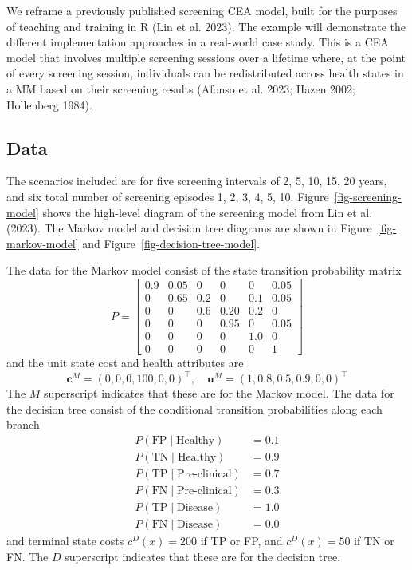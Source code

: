 \documentclass[
]{article}
\begin{document}
We reframe a previously published screening CEA model, built for the
purposes of teaching and training in R (Lin et al. 2023). The example
will demonstrate the different implementation approaches in a real-world
case study. This is a CEA model that involves multiple screening
sessions over a lifetime where, at the point of every screening session,
individuals can be redistributed across health states in a MM based on
their screening results (Afonso et al. 2023; Hazen 2002; Hollenberg
1984).

\subsection{Data}\label{data}

The scenarios included are for five screening intervals of 2, 5, 10, 15,
20 years, and six total number of screening episodes 1, 2, 3, 4, 5, 10.
Figure~\ref{fig-screening-model} shows the high-level diagram of the
screening model from Lin et al. (2023). The Markov model and decision
tree diagrams are shown in Figure~\ref{fig-markov-model} and
Figure~\ref{fig-decision-tree-model}.

The data for the Markov model consist of the state transition
probability matrix \[
P = \begin{bmatrix}
0.9 & 0.05 & 0 & 0 & 0 & 0.05 \\
0 & 0.65 & 0.2 & 0 & 0.1 & 0.05 \\
0 & 0 & 0.6 & 0.20 & 0.2 & 0 \\
0 & 0 & 0 & 0.95 & 0 & 0.05 \\
0 & 0 & 0 & 0 & 1.0 & 0 \\
0 & 0 & 0 & 0 & 0 & 1
\end{bmatrix}
\] and the unit state cost and health attributes are \[
\mathbf{c}^{M} = (0, 0, 0, 100, 0, 0)^{\top}, \quad \mathbf{u}^{M} = (1, 0.8, 0.5, 0.9, 0, 0)^{\top}
\] The \(M\) superscript indicates that these are for the Markov model.
The data for the decision tree consist of the conditional transition
probabilities along each branch \[
\begin{aligned}
P(\text{FP} \mid \text{Healthy}) &= 0.1 \\
P(\text{TN} \mid \text{Healthy}) &= 0.9 \\[6pt]
P(\text{TP} \mid \text{Pre-clinical}) &= 0.7 \\
P(\text{FN} \mid \text{Pre-clinical}) &= 0.3 \\[6pt]
P(\text{TP} \mid \text{Disease}) &= 1.0 \\
P(\text{FN} \mid \text{Disease}) &= 0.0
\end{aligned}
\] and terminal state costs \(c^{D}(x) = 200\) if TP or FP, and
\(c^{D}(x) = 50\) if TN or FN. The \(D\) superscript indicates that
these are for the decision tree.
\end{document}
